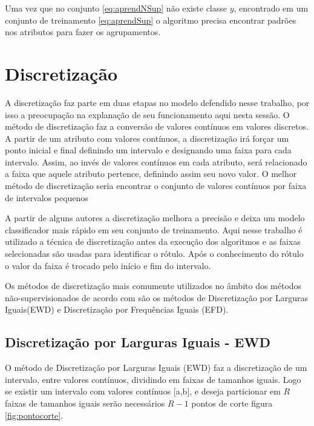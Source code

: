 Uma vez que no conjunto \ref{eq:aprendNSup} não existe classe ${y}$, encontrado em um conjunto de treinamento \ref{eq:aprendSup} o algoritmo precisa encontrar padrões nos atributos para fazer os agrupamentos.


\section{Discretização}\label{sec:discret}

A discretização faz parte em duas etapas no modelo defendido nesse trabalho, por isso a preocupação na explanação de seu funcionamento aqui nesta sessão. O método de discretização faz a conversão de valores contínuos em valores discretos. 
A partir de um atributo com valores contínuos, a discretização irá forçar um ponto inicial e final definindo um intervalo e designando uma faixa para cada intervalo. Assim, ao invés de valores contínuos em cada atributo, será relacionado a faixa que aquele atributo pertence, definindo assim seu novo valor. O melhor método de discretização seria encontrar o conjunto de valores contínuos por faixa de intervalos pequenos \cite{Kotsiantis2006}

A partir de alguns autores \cite{Catlett2006,Hwang2002} a discretização melhora a precisão e deixa um modelo classificador mais rápido em seu conjunto de treinamento. Aqui nesse trabalho é utilizado a técnica de discretização antes da execução dos algoritmos e as faixas selecionadas são usadas para identificar o rótulo. Após o conhecimento do rótulo o valor da faixa é trocado pelo início e fim do intervalo.

Os métodos de discretização mais comumente utilizados no âmbito dos métodos  não-supervisionados de acordo com \cite{Kotsiantis2006, Dougherty1995} são os métodos de Discretização por Larguras Iguais(EWD) e Discretização por Frequências Iguais (EFD).

\subsection{Discretização por Larguras Iguais - EWD}\label{subsec:ewd}

O método de Discretização por Larguras Iguais (EWD) faz a discretização de um intervalo, entre valores contínuos, dividindo em faixas de tamanhos iguais. Logo se existir um intervalo com valores contínuos [a,b], e deseja particionar em ${R}$ faixas de tamanhos iguais serão necessários ${R-1}$ pontos de corte figura \ref{fig:pontocorte}. 

